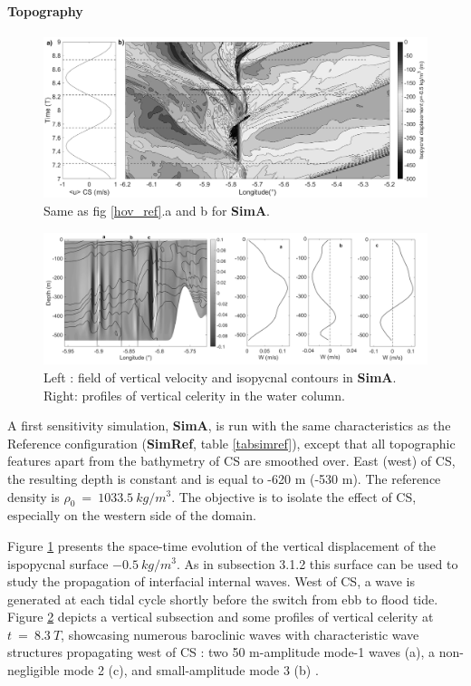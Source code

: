 \paragraph{Topography}
\label{TestPhy}

\begin{figure}[!t]
\centering
\includegraphics[width=1\linewidth]{./papier2D/hov_p-05_CS.png}
\caption{Same as fig \ref{hov_ref}.a and b for \textbf{SimA}.}
\label{hov_CS}
\end{figure}
\begin{figure}[!h]
\centering
\includegraphics[width=1\linewidth]{./papier2D/w_it515_modes_CS.png}
\caption{Left : field of vertical velocity  and isopycnal contours in \textbf{SimA}. Right: profiles of vertical celerity in the water column.}
\label{figCS_2}
\end{figure}

A first sensitivity simulation, \textbf{SimA}, is run with the same characteristics as the Reference configuration (\textbf{SimRef}, table \ref{tabsimref}), except that all topographic features apart from the bathymetry of CS are smoothed over. East (west) of CS, the resulting depth is constant and is equal to -620 m (-530 m). The reference density is $\rho_0\ =\ 1033.5\ kg/m^3$. The objective is to isolate the effect of CS, especially on the western side of the domain.

Figure \ref{hov_CS} presents the space-time evolution of the vertical displacement of the ispopycnal surface $-0.5\ kg/m^3$. As in subsection 3.1.2 this surface can be used to study the propagation of interfacial internal waves. West of CS, a wave is generated at each tidal cycle shortly before the switch from ebb to flood tide. Figure \ref{figCS_2} depicts a vertical subsection and some profiles of vertical celerity at $t\ =\ 8.3\ T$, showcasing numerous baroclinic waves with characteristic wave structures propagating west of CS : two 50 m-amplitude mode-1 waves (a), a non-negligible mode 2 (c), and small-amplitude mode 3 (b) .


